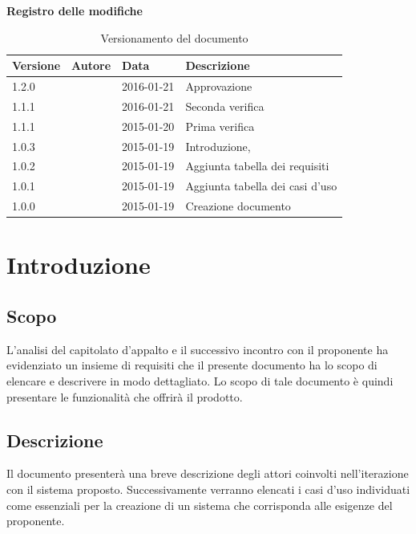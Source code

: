 \documentclass[12pt,a4paper]{article}
\begin{document}
\Large{\textbf{Registro delle modifiche}}\\
\normalsize

\begin{table}[H]
	\begin{center}
		\begin{tabular}{p{} p{} p{} p{}}
			\toprule
			\textbf{Versione}	&	\textbf{Autore}	&	\textbf{Data}	&	\textbf{Descrizione}\\
			\midrule
			\midrule
			1.2.0 & \NDC{} & 2016-01-21 &  Approvazione \\
			\midrule
			1.1.1 & \IB{} & 2016-01-21 &  Seconda verifica \\
			\midrule
			1.1.1 & \AVI{} & 2015-01-20 &  Prima verifica \\
			\midrule
			1.0.3 & \AVE{} & 2015-01-19 &  Introduzione,  \\
			\midrule
			1.0.2 & \WS{} & 2015-01-19 &  Aggiunta tabella dei requisiti \\
			\midrule
			1.0.1 & \AB{} & 2015-01-19 &  Aggiunta tabella dei casi d'uso \\
			\midrule
			1.0.0 & \NDC{} & 2015-01-19 &  Creazione documento \\
			\bottomrule
		\end{tabular}
		\caption{Versionamento del documento}
		\label{tabVers1}
	\end{center}
\end{table}
\newpage

\tableofcontents
\listoftables
\newpage

\section{Introduzione}

\subsection{Scopo}
L’analisi del capitolato d’appalto e il successivo incontro con il proponente ha evidenziato un insieme di requisiti che il presente documento ha lo scopo di elencare e descrivere in modo dettagliato. Lo scopo di tale documento è quindi presentare le funzionalità che offrirà il prodotto.

\subsection{Descrizione}
Il documento presenterà una breve descrizione degli attori coinvolti nell'iterazione con il sistema proposto. Successivamente verranno elencati i casi d'uso individuati come essenziali per la creazione di un sistema che corrisponda alle esigenze del proponente.
\end{document}
